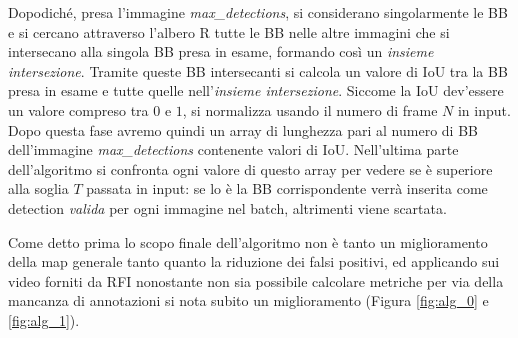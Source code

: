 Dopodiché, presa l'immagine \textit{max\_detections}, si considerano singolarmente le \ac{BB} e si cercano attraverso l'albero R tutte le \ac{BB} nelle altre immagini che si intersecano alla singola \ac{BB} presa in esame, formando così un \textit{insieme intersezione}. 
Tramite queste \ac{BB} intersecanti si calcola un valore di \ac{IoU} tra la \ac{BB} presa in esame e tutte quelle nell'\textit{insieme intersezione}. Siccome la \ac{IoU} dev'essere un valore compreso tra $0$ e $1$, si normalizza usando il numero di frame $N$ in input.
Dopo questa fase avremo quindi un array di lunghezza pari al numero di \ac{BB} dell'immagine \textit{max\_detections} contenente valori di \ac{IoU}.
Nell'ultima parte dell'algoritmo si confronta ogni valore di questo array per vedere se è superiore alla soglia $T$ passata in input: se lo è la \ac{BB} corrispondente verrà inserita come detection \textit{valida} per ogni immagine nel batch, altrimenti viene scartata.

Come detto prima lo scopo finale dell'algoritmo non è tanto un miglioramento della \ac{map} generale tanto quanto la riduzione dei falsi positivi, ed applicando sui video forniti da \ac{RFI} nonostante non sia possibile calcolare metriche per via della mancanza di annotazioni si nota subito un miglioramento (Figura \ref{fig:alg_0} e \ref{fig:alg_1}).


